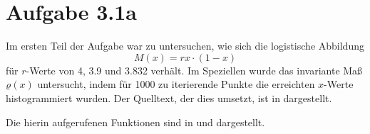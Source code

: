 \section*{Aufgabe 3.1a}
Im ersten Teil der Aufgabe war zu untersuchen, wie sich die logistische
Abbildung $$M(x) = rx\cdot (1-x)$$ für $r$-Werte von 4, 3.9 und 3.832 verhält.
Im Speziellen wurde das invariante Maß $ϱ(x)$ untersucht, indem für 1000 zu
iterierende Punkte die erreichten $x$-Werte histogrammiert wurden. Der
Quelltext, der dies umsetzt, ist in  dargestellt.



Die hierin aufgerufenen Funktionen sind in  und 
dargestellt.




